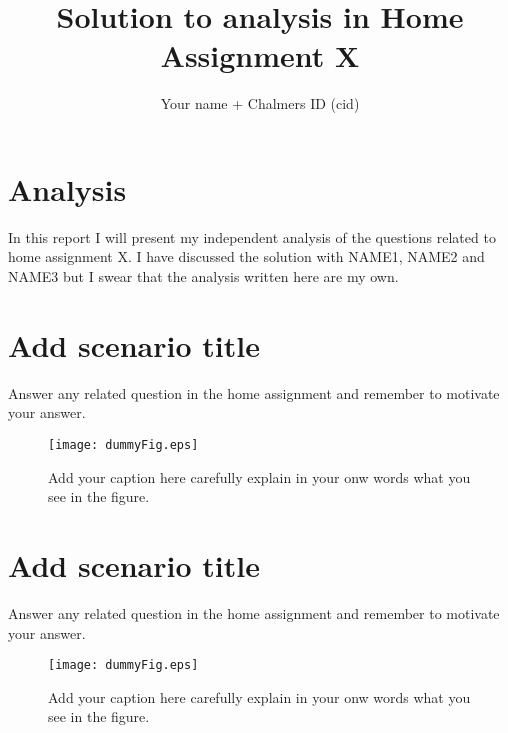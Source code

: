 \documentclass{article}
\title{Solution to analysis in Home Assignment X}
\author{Your name + Chalmers ID (cid)}
\date{\empty}
\begin{document}
\maketitle

\section*{Analysis}

In this report I will present my independent analysis of the questions related to home assignment X. I have discussed the solution with NAME1, NAME2 and NAME3 but I swear that the analysis written here are my own.

\section{Add scenario title}
Answer any related question in the home assignment and remember to motivate your answer. 
\begin{figure}[ht]
  \begin{center}
  \texttt{[image: dummyFig.eps]} %
  \caption{Add your caption here carefully explain in your onw words what you see in the figure.}
  \end{center}
\end{figure}

\section{Add scenario title}
Answer any related question in the home assignment and remember to motivate your answer. 
\begin{figure}[h]
  \begin{center}
  \texttt{[image: dummyFig.eps]} %
  \caption{Add your caption here carefully explain in your onw words what you see in the figure.}
\end{center}
\end{figure}
\end{document}
